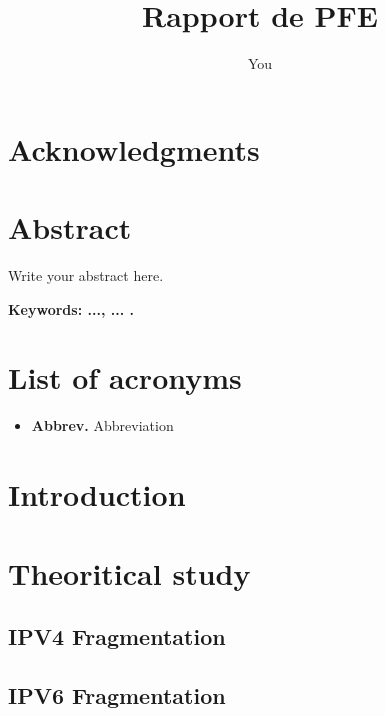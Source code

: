 \documentclass[12pt,a4paper,oneside,english]{book}
\author{You}
\title{Rapport de PFE}
\begin{document}

\chapter*{Acknowledgments}

\frontmatter
\chapter*{Abstract}
\normalsize{Write your abstract here.

\medskip
{\noindent \textbf{Keywords: ..., ... .} }

\tableofcontents{}
\newpage 
\listoffigures
\newpage 
\listoftables
\newpage
{}
\chapter*{List of acronyms}
\begin{itemize}
\item \textbf{Abbrev.} Abbreviation
\end{itemize}

\mainmatter
\chapter*{Introduction}


\chapter{Theoritical study}

\label{ch:1er}

\section{IPV4 Fragmentation}

\section{IPV6 Fragmentation}

}
\end{document}
